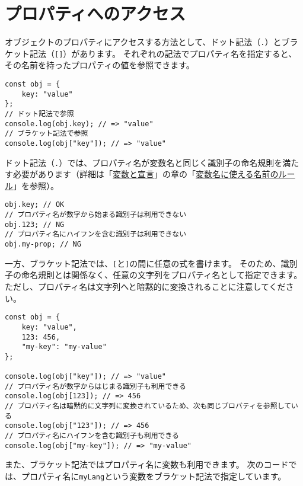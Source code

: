 \hypertarget{property-access}{%
\section{プロパティへのアクセス}\label{property-access}}

オブジェクトのプロパティにアクセスする方法として、ドット記法（\texttt{.}）とブラケット記法（\texttt{[]}）があります。
それぞれの記法でプロパティ名を指定すると、その名前を持ったプロパティの値を参照できます。

\begin{lstlisting}
const obj = {
    key: "value"
};
// ドット記法で参照
console.log(obj.key); // => "value"
// ブラケット記法で参照
console.log(obj["key"]); // => "value"
\end{lstlisting}

ドット記法（\texttt{.}）では、プロパティ名が変数名と同じく識別子の命名規則を満たす必要があります（詳細は「\hyperlink{variable-and-declaration}{変数と宣言}」の章の「\hyperlink{variable-name}{変数名に使える名前のルール}」を参照）。

\begin{lstlisting}
obj.key; // OK
// プロパティ名が数字から始まる識別子は利用できない
obj.123; // NG
// プロパティ名にハイフンを含む識別子は利用できない
obj.my-prop; // NG
\end{lstlisting}

一方、ブラケット記法では、\texttt{[}と\texttt{]}の間に任意の式を書けます。
そのため、識別子の命名規則とは関係なく、任意の文字列をプロパティ名として指定できます。
ただし、プロパティ名は文字列へと暗黙的に変換されることに注意してください。

\begin{lstlisting}
const obj = {
    key: "value",
    123: 456,
    "my-key": "my-value"
};

console.log(obj["key"]); // => "value"
// プロパティ名が数字からはじまる識別子も利用できる
console.log(obj[123]); // => 456
// プロパティ名は暗黙的に文字列に変換されているため、次も同じプロパティを参照している
console.log(obj["123"]); // => 456
// プロパティ名にハイフンを含む識別子も利用できる
console.log(obj["my-key"]); // => "my-value"
\end{lstlisting}

また、ブラケット記法ではプロパティ名に変数も利用できます。
次のコードでは、プロパティ名に\texttt{myLang}という変数をブラケット記法で指定しています。

